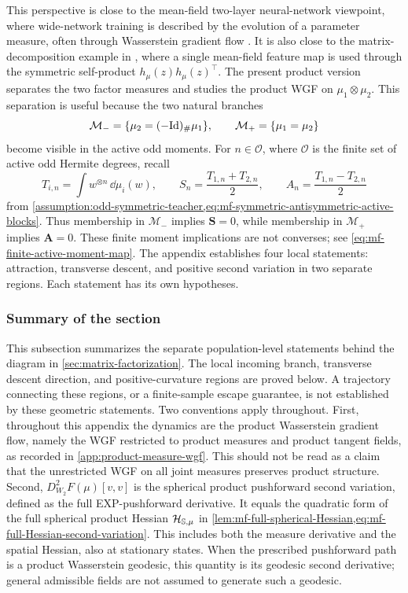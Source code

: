 This perspective is close to the mean-field two-layer neural-network viewpoint,
where wide-network training is described by the evolution of a parameter
measure, often through Wasserstein gradient flow
\citep{songmei2018,chizat2018,nitanda2022convex}. It is also close to the
matrix-decomposition example in \citet{yamamoto2025hessianguided}, where a
single mean-field feature map is used through the symmetric self-product
\(h_{\mu}(z)h_{\mu}(z)^\top\).  The present product version separates the two
factor measures and studies the product WGF on
\(\mu_1\otimes\mu_2\).  This separation is useful because the two natural
branches
\[
    \mathcal M_-=\{\mu_2=(-\mathrm{Id})_\#\mu_1\},
    \qquad
    \mathcal M_+=\{\mu_1=\mu_2\}
\]
become visible in the active odd moments. For
\(n\in\mathcal O\), where \(\mathcal O\) is the finite set of active odd
Hermite degrees, recall
\[
 T_{i,n}=\int w^{\otimes n}\,\dd\mu_i(w),\qquad
 S_n=\frac{T_{1,n}+T_{2,n}}2,\qquad
 A_n=\frac{T_{1,n}-T_{2,n}}2
\]
from \cref{assumption:odd-symmetric-teacher,eq:mf-symmetric-antisymmetric-active-blocks}.
Thus
membership in \(\mathcal M_-\) implies \(\mathbf S=0\), while
membership in \(\mathcal M_+\) implies \(\mathbf A=0\).
These finite moment implications are not converses; see
\eqref{eq:mf-finite-active-moment-map}.
The appendix establishes four local statements: attraction, transverse
descent, and positive second variation in two separate regions. Each statement
has its own hypotheses.

\subsubsection{Summary of the section}

This subsection summarizes the separate population-level statements behind
the diagram in \cref{sec:matrix-factorization}. The local incoming branch,
transverse descent direction, and positive-curvature regions are proved below.
A trajectory connecting these regions, or a finite-sample escape guarantee,
is not established by these geometric statements.
Two conventions apply throughout.
First, throughout this appendix the dynamics are the product Wasserstein gradient
flow, namely the WGF restricted to product measures and product tangent fields, as
recorded in \cref{app:product-measure-wgf}.  This should not be read as a claim
that the unrestricted WGF on all joint measures preserves product structure.
Second, $D^2_{W_2}F(\mu)[v,v]$ is the spherical product pushforward second
variation, defined as the full EXP-pushforward derivative. It equals the
quadratic form of the full
spherical product Hessian $\mathcal H_{\mathbb{S},\mu}$ in
\cref{lem:mf-full-spherical-Hessian,eq:mf-full-Hessian-second-variation}.
This includes both the measure derivative and the spatial Hessian,
also at stationary states. When the prescribed pushforward path is a product
Wasserstein geodesic, this quantity is its geodesic second derivative; general
admissible fields are not assumed to generate such a geodesic.

